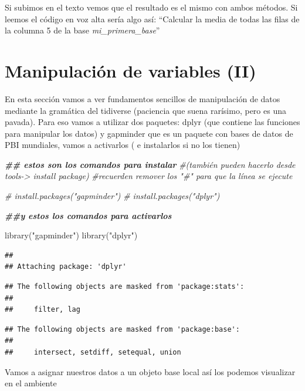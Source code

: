 \documentclass[
]{book}
\newenvironment{Shaded}{\begin{snugshade}}{\end{snugshade}}
\newcommand{\CommentTok}[1]{\textcolor[rgb]{0.56,0.35,0.01}{\textit{#1}}}
\newcommand{\DocumentationTok}[1]{\textcolor[rgb]{0.56,0.35,0.01}{\textbf{\textit{#1}}}}
\newcommand{\FunctionTok}[1]{\textcolor[rgb]{0.00,0.00,0.00}{#1}}
\newcommand{\NormalTok}[1]{#1}
\newcommand{\StringTok}[1]{\textcolor[rgb]{0.31,0.60,0.02}{#1}}
\begin{document}
Si subimos en el texto vemos que el resultado es el mismo con ambos métodos. Si leemos el código en voz alta sería algo así: ``Calcular la media de todas las filas de la columna 5 de la base \emph{mi\_primera\_base}''

\hypertarget{manipulaciuxf3n-de-variables-ii}{%
\chapter{Manipulación de variables (II)}\label{manipulaciuxf3n-de-variables-ii}}

En esta sección vamos a ver fundamentos sencillos de manipulación de datos mediante la gramática del tidiverse (paciencia que suena rarísimo, pero es una pavada).
Para eso vamos a utilizar dos paquetes: dplyr (que contiene las funciones para manipular los datos) y gapminder que es un paquete con bases de datos de PBI mundiales, vamos a activarlos ( e instalarlos si no los tienen)

\begin{Shaded}
\begin{Highlighting}[]
\DocumentationTok{\#\# estos son los comandos para instalar }
\CommentTok{\#(también pueden hacerlo desde tools{-}\textgreater{} install package)}
\CommentTok{\#recuerden remover los "\#" para que la línea se ejecute }


\CommentTok{\# install.packages("gapminder")}
\CommentTok{\# install.packages("dplyr") }


\DocumentationTok{\#\#y estos los comandos para activarlos}

\FunctionTok{library}\NormalTok{(}\StringTok{"gapminder"}\NormalTok{)}
\FunctionTok{library}\NormalTok{(}\StringTok{"dplyr"}\NormalTok{)}
\end{Highlighting}
\end{Shaded}

\begin{verbatim}
## 
## Attaching package: 'dplyr'
\end{verbatim}

\begin{verbatim}
## The following objects are masked from 'package:stats':
## 
##     filter, lag
\end{verbatim}

\begin{verbatim}
## The following objects are masked from 'package:base':
## 
##     intersect, setdiff, setequal, union
\end{verbatim}

Vamos a asignar nuestros datos a un objeto base local así los podemos visualizar en el ambiente
\end{document}
